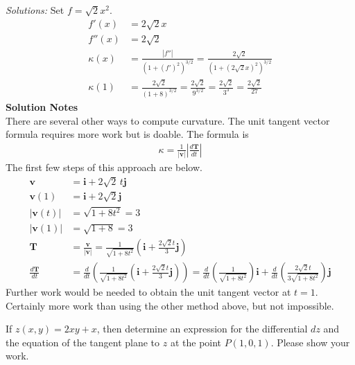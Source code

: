 \ifnum {} {\color{DarkBlue} \textit{Solutions:} Set $f=\sqrt2x^2$. 
\begin{align*}
    f'(x) &= 2\sqrt2 x \\
    f''(x) &= 2\sqrt2 \\
    \kappa(x) &= \frac{|f''|}{(1+(f')^2)^{3/2}} 
    = \frac{2\sqrt2}{(1 + (2\sqrt2x)^2)^{3/2}} \\
    \kappa(1) 
    &= \frac{2\sqrt2}{(1+8)^{3/2}} 
    = \frac{2\sqrt2}{9^{3/2}} 
    = \frac{2\sqrt2}{3^3} 
    = \frac{2\sqrt2}{27} 
\end{align*}
\textbf{Solution Notes} \\
There are several other ways to compute curvature. The unit tangent vector formula requires more work but is doable. The formula is
\begin{align}
    \kappa = \frac{1}{|\mathbf v|}\left| \frac{d\mathbf T}{dt}\right|
\end{align}
The first few steps of this approach are below. 
\begin{align}
    \mathbf v &= \mathbf i +2\sqrt2 \, t \mathbf j \\
    \mathbf v(1) &= \mathbf i +2\sqrt2  \mathbf j \\
    |\mathbf v(t) | &= \sqrt{1+ 8t^2} = 3\\
    |\mathbf v(1) | &= \sqrt{1+ 8} = 3\\
    \mathbf T &= \frac{\mathbf v}{|\mathbf v |} = \frac{1}{\sqrt{1+8t^2}} \left( \mathbf i + \frac{2\sqrt2 t}{3}\mathbf j \right)\\
    \frac{d\mathbf T}{dt } &= \frac{d}{dt} \left( \frac{1}{\sqrt{1+8t^2}} \left( \mathbf i + \frac{2\sqrt2 t}{3}\mathbf j \right)\right) = \frac{d}{dt} \left( \frac{1}{\sqrt{1+8t^2}} \right)  \mathbf i + \frac{d}{dt} \left(\frac{2\sqrt2 t}{3\sqrt{1+8t^2}}  \right) \mathbf j
\end{align}
Further work would be needed to obtain the unit tangent vector at $t=1$. Certainly more work than using the other method above, but not impossible. 
}
\else
\vspace{9cm}
\fi
\fi

\ifnum {}
\question[4] If $z(x,y) = 2xy + x$, then determine an expression for the differential $dz$ and the equation of the tangent plane to $z$ at the point $P(1,0,1)$. Please show your work. 

